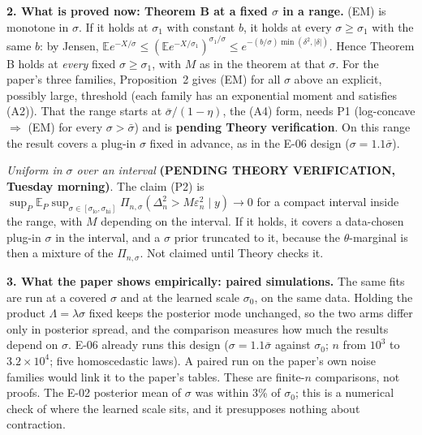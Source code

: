 \documentclass[11pt]{article}
\newcommand{\E}{\mathbb{E}}
\newcommand{\sbar}{\bar\sigma}
\theoremstyle{plain}
\theoremstyle{definition}
\theoremstyle{remark}
\begin{document}
\medskip\noindent\textbf{2. What is proved now: Theorem B at a fixed $\sigma$ in a range.}
(EM) is monotone in $\sigma$. If it holds at $\sigma_1$ with constant $b$, it holds at every $\sigma\ge\sigma_1$ with the same $b$: by Jensen, $\E e^{-X/\sigma}\le(\E e^{-X/\sigma_1})^{\sigma_1/\sigma}\le e^{-(b/\sigma)\min(\delta^2,|\delta|)}$. Hence Theorem B holds at \emph{every} fixed $\sigma\ge\sigma_1$, with $M$ as in the theorem at that $\sigma$. For the paper's three families, Proposition~2 gives (EM) for all $\sigma$ above an explicit, possibly large, threshold (each family has an exponential moment and satisfies (A2)). That the range starts at $\sbar/(1-\eta)$, the (A4) form, needs P1 (log-concave $\Rightarrow$ (EM) for every $\sigma>\sbar$) and is \textcolor{progress}{\textbf{pending Theory verification}}. On this range the result covers a plug-in $\sigma$ fixed in advance, as in the E-06 design ($\sigma=1.1\sbar$).

\noindent\textit{Uniform in $\sigma$ over an interval} \textcolor{progress}{\textbf{(PENDING THEORY VERIFICATION, Tuesday morning)}}. The claim (P2) is $\sup_P\E_P\sup_{\sigma\in[\sigma_{\mathrm{lo}},\sigma_{\mathrm{hi}}]}\Pi_{n,\sigma}(\Delta_n^2>M\varepsilon_n^2\mid y)\to0$ for a compact interval inside the range, with $M$ depending on the interval. If it holds, it covers a data-chosen plug-in $\sigma$ in the interval, and a $\sigma$ prior truncated to it, because the $\theta$-marginal is then a mixture of the $\Pi_{n,\sigma}$. Not claimed until Theory checks it.

\medskip\noindent\textbf{3. What the paper shows empirically: paired simulations.} The same fits are run at a covered $\sigma$ and at the learned scale $\sigma_0$, on the same data. Holding the product $\Lambda=\lambda\sigma$ fixed keeps the posterior mode unchanged, so the two arms differ only in posterior spread, and the comparison measures how much the results depend on $\sigma$. E-06 already runs this design ($\sigma=1.1\sbar$ against $\sigma_0$; $n$ from $10^3$ to $3.2\times10^4$; five homoscedastic laws). A paired run on the paper's own noise families would link it to the paper's tables. These are finite-$n$ comparisons, not proofs. The E-02 posterior mean of $\sigma$ was within 3\% of $\sigma_0$; this is a numerical check of where the learned scale sits, and it presupposes nothing about contraction.
\end{document}
